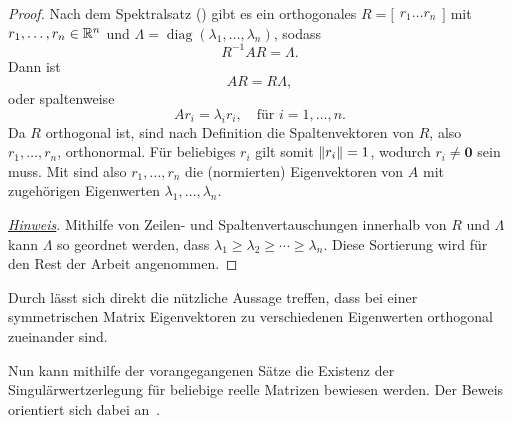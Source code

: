 \begin{proof}
    Nach dem Spektralsatz () gibt es ein orthogonales 
    \(
    R=
    \big[
    \begin{matrix}
        r_1 \dots r_n
    \end{matrix}
    \big]
    \)
    mit
    \(r_1,\ldots,r_n \in \mathbb{R}^{n}\) 
    und 
    \(\Lambda = \operatorname{diag}(\lambda_1,\ldots,\lambda_n)\), sodass
    \begin{equation*}
        R^{-1}AR = \Lambda.
    \end{equation*}
    Dann ist
    \begin{equation*}
        AR = R\Lambda, 
    \end{equation*} 
    oder spaltenweise
    \begin{equation*}
        Ar_i = {\lambda}_i r_i, \quad \text{für } i = 1,\ldots,n.
    \end{equation*}
    Da \(R\) orthogonal ist, sind nach Definition die Spaltenvektoren von \(R\), also \(r_1,\ldots,r_n\), orthonormal.
    Für beliebiges \(r_i\) gilt somit \(\lVert r_i\rVert = 1\), wodurch \(r_i \neq \symbf{0}\) sein muss.
    Mit  sind also \(r_1,\ldots,r_n\) die (normierten) Eigenvektoren von \(A\) mit zugehörigen Eigenwerten \(\lambda_1,\ldots,\lambda_n\).
    
    \underline{\emph{Hinweis}}. Mithilfe von Zeilen- und Spaltenvertauschungen innerhalb von \(R\) und \(\Lambda\) kann \(\Lambda\) so geordnet werden, dass \(\lambda_1 \geq \lambda_2 \geq \cdots \geq \lambda_n\).
Diese Sortierung wird für den Rest der Arbeit angenommen.
\end{proof}
\begin{remark}\label{rem:orth}
    Durch  lässt sich direkt die nützliche Aussage treffen, dass bei einer symmetrischen Matrix Eigenvektoren zu verschiedenen Eigenwerten orthogonal zueinander sind. 
\end{remark}
Nun kann mithilfe der vorangegangenen Sätze die Existenz der Singulärwertzerlegung für beliebige reelle Matrizen bewiesen werden.
Der Beweis orientiert sich dabei an~\cite{chenLecture5Singular2020}.

